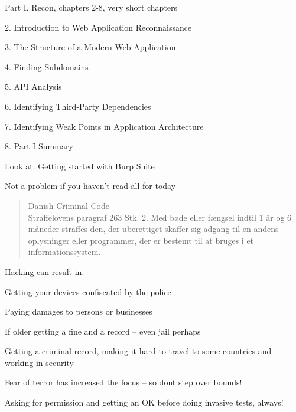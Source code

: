 \documentclass[Screen16to9,17pt]{foils}
\begin{document}
\begin{list2}
\item Part I. Recon, chapters 2-8, very short chapters
\item 2. Introduction to Web Application Reconnaissance
\item 3. The Structure of a Modern Web Application
\item 4. Finding Subdomains
\item 5. API Analysis
\item 6. Identifying Third-Party Dependencies
\item 7. Identifying Weak Points in Application Architecture
\item 8. Part I Summary
\item Look at: Getting started with Burp Suite\\
\end{list2}
{\small Not a problem if you haven't read all for today}



\begin{quote}\small
Danish Criminal Code\\
Straffelovens paragraf 263 Stk. 2. Med bøde eller fængsel indtil 1 år og 6 måneder straffes den, der uberettiget skaffer sig adgang til en andens oplysninger eller programmer, der er bestemt til at bruges i et informationssystem.
\end{quote}

Hacking can result in:
\begin{list2}
\item Getting your devices confiscated by the police
\item Paying damages to persons or businesses
\item If older getting a fine and a record -- even jail perhaps
\item Getting a criminal record, making it hard to travel to some countries and working in security
\item Fear of terror has increased the focus -- so dont step over bounds!
\end{list2}

Asking for permission and getting an OK before doing invasive tests, always!

\end{document}
